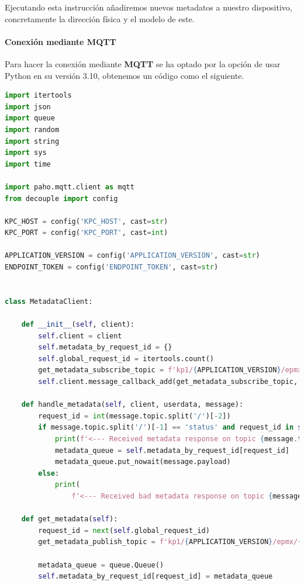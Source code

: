{Ejecutando esta instrucción añadiremos nuevos metadatos a nuestro dispositivo, concretamente la dirección física y el modelo de este.

\paragraph{Conexión mediante MQTT}

Para hacer la conexión mediante \textbf{MQTT} se ha optado por la opción de usar Python en su versión 3.10, obtenemos un código como el siguiente.

\begin{lstlisting}[language=Python]
import itertools
import json
import queue
import random
import string
import sys
import time

import paho.mqtt.client as mqtt
from decouple import config

KPC_HOST = config('KPC_HOST', cast=str)
KPC_PORT = config('KPC_PORT', cast=int)

APPLICATION_VERSION = config('APPLICATION_VERSION', cast=str)
ENDPOINT_TOKEN = config('ENDPOINT_TOKEN', cast=str)


class MetadataClient:

    def __init__(self, client):
        self.client = client
        self.metadata_by_request_id = {}
        self.global_request_id = itertools.count()
        get_metadata_subscribe_topic = f'kp1/{APPLICATION_VERSION}/epmx/{ENDPOINT_TOKEN}/get/#'
        self.client.message_callback_add(get_metadata_subscribe_topic, self.handle_metadata)

    def handle_metadata(self, client, userdata, message):
        request_id = int(message.topic.split('/')[-2])
        if message.topic.split('/')[-1] == 'status' and request_id in self.metadata_by_request_id:
            print(f'<--- Received metadata response on topic {message.topic}')
            metadata_queue = self.metadata_by_request_id[request_id]
            metadata_queue.put_nowait(message.payload)
        else:
            print(
                f'<--- Received bad metadata response on topic {message.topic}:\n{str(message.payload.decode("utf-8"))}')

    def get_metadata(self):
        request_id = next(self.global_request_id)
        get_metadata_publish_topic = f'kp1/{APPLICATION_VERSION}/epmx/{ENDPOINT_TOKEN}/get/{request_id}'

        metadata_queue = queue.Queue()
        self.metadata_by_request_id[request_id] = metadata_queue


\end{lstlisting}}
